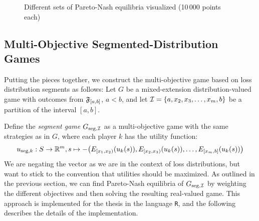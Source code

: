 \documentclass[a4paper]{scrreprt}
\begin{document}
\begin{figure}[h]
%        
%        
%        
        \caption{Different sets of Pareto-Nash equilibria visualized (10\,000 points each)}
        \label{fig:paretoNashEquilibriaShowcase}
    \end{figure}

    \subsection{Multi-Objective Segmented-Distribution Games}
    Putting the pieces together, we construct the multi-objective game based on loss distribution segments as follows:
    Let $G$ be a mixed-extension distribution-valued game with outcomes from $\mathfrak{F}_{[a, b]}$, $a < b$, and let $\mathcal{I} = \{a, x_2, x_3, \dots, x_m, b\}$ be a partition of the interval $[a, b]$.
    
    \newcommand{\Gseg}[1][]{G_{\text{seg,$\ifstrempty{#1}{\mathcal{I}}{#1}$}}}
    Define the \emph{segment game} $\Gseg$ as a multi-objective game with the same strategies as in $G$, where each player $k$ has the utility function:
    \begin{gather}
        u_{\text{seg}, k}: S \to \mathbb{R}^m, s \mapsto -\bigl(E_{[x_1, x_2)}(u_k(s)), E_{[x_2, x_3)}(u_k(s)), \dots, E_{[x_m, b]}(u_k(s))\bigr)
        \label{eq:segmentsExpectationVector}
    \end{gather}
    We are negating the vector as we are in the context of loss distributions, but want to stick to the convention that utilities should be maximized.
    As outlined in the previous section, we can find Pareto-Nash equilibria  of $\Gseg$ by weighting the different objectives and then solving the resulting real-valued game.
    This approach is implemented for the thesis in the language \texttt{R}, and the following describes the details of the implementation.
    
\end{document}
